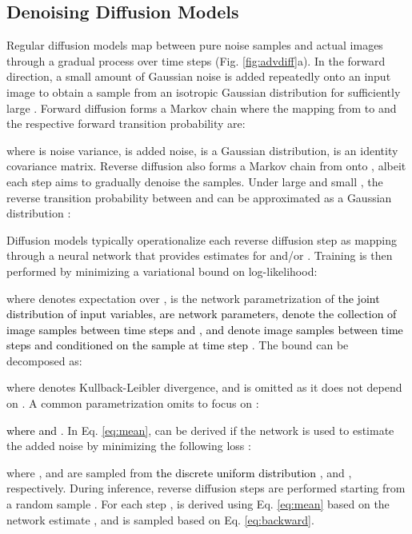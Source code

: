 \documentclass[journal,twoside,web]{ieeecolor}
\newcommand*{\revhl}{\textcolor{black}}
\begin{document}
\subsection{Denoising Diffusion Models}
Regular diffusion models map between pure noise samples and actual images through a gradual process over  time steps (Fig. \ref{fig:advdiff}a). In the forward direction, a small amount of Gaussian noise is added repeatedly onto an input image  to obtain a sample  from an isotropic Gaussian distribution for sufficiently large . Forward diffusion forms a Markov chain where the mapping from  to  and the respective forward transition probability are:

where  is noise variance,  is added noise,  is a Gaussian distribution,  is an identity covariance matrix. Reverse diffusion also forms a Markov chain from  onto , albeit each step aims to gradually denoise the samples. Under large  and small , the reverse transition probability between  and  can be approximated as a Gaussian distribution \cite{sohl2015deep, feller1949theory}: 


Diffusion models typically operationalize each reverse diffusion step as mapping through a neural network that provides estimates for  and/or . Training is then performed by minimizing a variational bound on log-likelihood: 

where  denotes expectation over ,  is the network parametrization of \revhl{the joint distribution of input variables,  are network parameters,  denote the collection of image samples between time steps  and , and  denote image samples between time steps  and  conditioned on the sample at time step }. The bound can be decomposed as:

where  denotes Kullback-Leibler divergence, and  is omitted as it does not depend on . A common parametrization omits  to focus on :

\revhl{where  and }. In Eq. \ref{eq:mean},  can be derived if the network is used to estimate the added noise  by minimizing the following loss \cite{ho2020denoising}:

where ,  and  are sampled from \revhl{the discrete uniform distribution} ,  and , respectively. During inference, reverse diffusion steps are performed starting from a random sample . For each step ,  is derived using Eq. \ref{eq:mean} based on the network estimate , and  is sampled based on Eq. \ref{eq:backward}.
\end{document}
